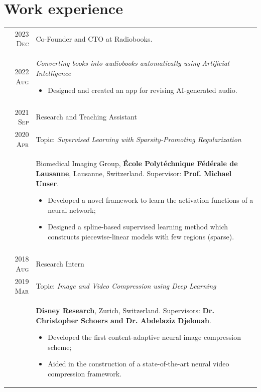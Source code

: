 \documentclass[a4paper,11pt]{article}
\begin{document}
  \vspace{15pt}

  \section{Work experience}

    \begin{tabular}{r|p{13cm}}

      \textsc{2023 Dec} 	& Co-Founder and CTO at Radiobooks. \\
      \textsc{2022 Aug} 	& \emph{Converting books into audiobooks automatically using Artificial Intelligence}
      \begin{itemize}[leftmargin=*,noitemsep]
          \item \footnotesize{Designed and created an app for revising AI-generated audio.}
      \end{itemize} \vspace*{-\baselineskip}\\
      \multicolumn{2}{c}{} \\


      \textsc{2021 Sep} 	& Research and Teaching Assistant \\
      \textsc{2020 Apr} 	& Topic: \emph{Supervised Learning with Sparsity-Promoting Regularization} \\
				& \footnotesize{ Biomedical Imaging Group, \textbf{École Polytéchnique Fédérale de Lausanne}, Lausanne, Switzerland. Supervisor: \textbf{Prof. Michael Unser}.
				  }
        \begin{itemize}[leftmargin=*,noitemsep]
          \item \footnotesize{Developed a novel framework to learn the activation functions of a neural network;}
          \item \footnotesize{Designed a spline-based supervised learning method which constructs piecewise-linear models with few regions (sparse).}
        \end{itemize} \vspace*{-\baselineskip}\\
      \multicolumn{2}{c}{} \\

      \textsc{2018 Aug} & Research Intern \\
      \textsc{2019 Mar} & Topic: \emph{Image and Video Compression using Deep Learning} \\
				& \footnotesize{\textbf{Disney Research}, Zurich, Switzerland. Supervisors: \textbf{Dr. Christopher Schoers and Dr. Abdelaziz Djelouah}.}
        \begin{itemize}[leftmargin=*,noitemsep]
          \item \footnotesize{
            Developed the first content-adaptive neural image compression scheme;}
          \item  \footnotesize{
            Aided in the construction of a state-of-the-art neural video compression framework.}
          \end{itemize} \vspace*{-\baselineskip}


\end{tabular}
\end{document}
